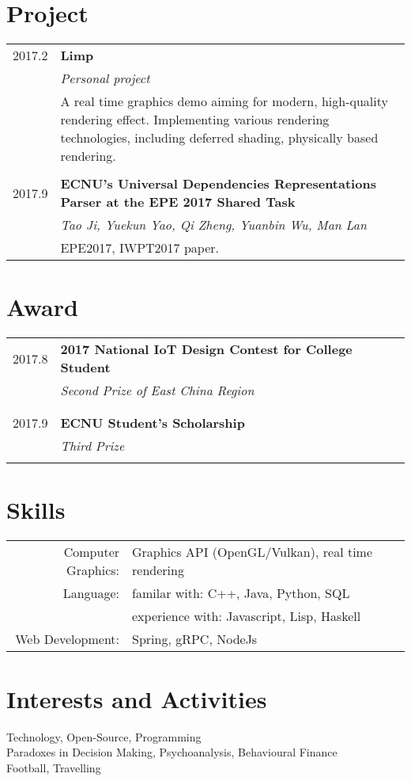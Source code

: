 \documentclass[a4paper,10pt]{article}
\begin{document}
\section{Project}
\begin{tabular}{r|p{12cm}}
 \textsc{\small{2017.2}} & \textbf{Limp}\\&\emph{Personal project}\\&\footnotesize{A real time graphics demo aiming for modern, high-quality rendering effect. Implementing various rendering technologies, including deferred shading, physically based rendering.}\\\multicolumn{2}{c}{} \\
\textsc{\small{2017.9}} & \textbf{ECNU's Universal Dependencies Representations Parser at the EPE 2017 Shared Task}\\&\emph{Tao Ji, Yuekun Yao, Qi Zheng, Yuanbin Wu, Man Lan}\\&\footnotesize{EPE2017, IWPT2017 paper.}
\end{tabular}


\section{Award}
\begin{tabular}{r|p{12cm}}
 \textsc{\small{2017.8}} & \textbf{2017 National IoT Design Contest for College Student}\\&\emph{Second Prize of East China Region}\\&\footnotesize{}\\\multicolumn{2}{c}{} \\
\textsc{\small{2017.9}} & \textbf{ECNU Student's Scholarship}\\&\emph{Third Prize}\\&\footnotesize{}
\end{tabular}

\section{Skills}
\begin{tabular}{rp{12cm}}
 Computer Graphics:& Graphics API (OpenGL/Vulkan), real time rendering\\
Language:& familar with: C++, Java, Python, SQL\\
         & experience with: Javascript, Lisp, Haskell\\
Web Development:& Spring, gRPC, NodeJs
\end{tabular}

\section{Interests and Activities}
Technology, Open-Source, Programming\\
Paradoxes in Decision Making, Psychoanalysis, Behavioural Finance\\
Football, Travelling
\end{document}
